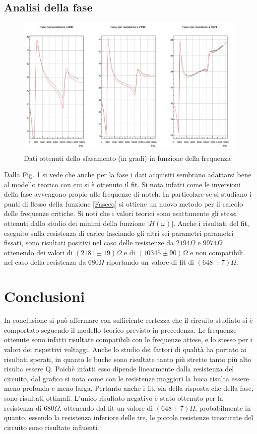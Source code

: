 \documentclass[leqno]{article}
\begin{document}
	\subsection{Analisi della fase}
	\begin{figure} [h!]
		\centering
		\includegraphics [scale=0.25] {fase.png}
		\caption{Dati ottenuti dello sfasamento (in gradi) in funzione della frequenza}
		\label{Fase}
	\end{figure}
	Dalla Fig. \ref{Fase} si vede che anche per la fase i dati acquisiti sembrano adattarsi bene al modello teorico con cui si è ottenuto il fit. Si nota infatti come le inversioni della fase avvengono propio alle frequenze di notch.
	In particolare se si studiano i punti di flesso della funzione \eqref{Faseeq} si ottiene un nuovo metodo per il calcolo delle frequenze critiche. Si noti che i valori teorici sono esattamente gli stessi ottenuti dallo studio dei minimi della funzione $|H(\omega)|$. Anche i risultati del fit, eseguito sulla resistenza di carico lasciando gli altri sei parametri parametri fissati, sono risultati positivi nel caso delle resistenze da $2194\Omega$ e $9974\Omega$ ottenendo dei valori di $(2181   \pm   19) \Omega$ e di $( 10345   \pm   90) \Omega$ e non compatibili nel caso della resistenza da $680\Omega$ riportando un valore di fit di $(648  \pm   7) \Omega$.
	
	\section{Conclusioni}
	In conclusione si può affermare con sufficiente certezza che il circuito studiato si è comportato seguendo il modello teorico previsto in precedenza. Le frequenze ottenute sono infatti risultate compatibili con le frequenze attese, e lo stesso per i valori dei rispettivi voltaggi. 
	Anche lo studio dei fattori di qualità ha portato ai risultati sperati, in quanto le buche sono risultate tanto più strette tanto più alto risulta essere Q. Poichè infatti esso dipende linearmente dalla resistenza del circuito, dal grafico si nota come con le resistenze maggiori la buca risulta essere meno profonda e meno larga.
	Pertanto anche i fit, sia della risposta che della fase, sono risultati ottimali.
	L'unico risultato negativo è stato ottenuto per la resistenza di $680 \Omega$, ottenendo dal fit un valore di $(648 \pm 7) \Omega$, probabilmente in quanto, essendo la resistenza inferiore delle tre, le piccole resistenze trascurate del circuito sono risultate influenti.
	
\end{document}
